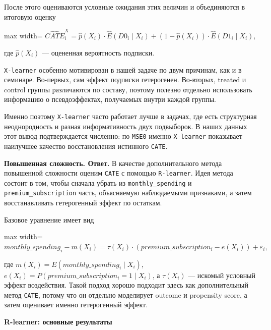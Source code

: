 \documentclass[11pt]{article}
\begin{document}
После этого оцениваются условные ожидания этих величин и объединяются в
итоговую оценку

\begin{center}
\begin{adjustbox}{max width=\linewidth}
\(\displaystyle \widehat{CATE}^{X}_i = \hat{p}(X_i) \cdot \widehat{E}(D0_i \mid X_i) + (1-\hat{p}(X_i)) \cdot \widehat{E}(D1_i \mid X_i),\)
\end{adjustbox}
\end{center}

где \(\hat{p}(X_i)\) --- оцененная вероятность подписки.

    \texttt{X-learner} особенно мотивирован в нашей задаче по двум причинам,
как и в семинаре. Во-первых, сам эффект подписки гетерогенен. Во-вторых,
treated и control группы различаются по составу, поэтому полезно
отдельно использовать информацию о псевдоэффектах, получаемых внутри
каждой группы.

Именно поэтому \texttt{X-learner} часто работает лучше в задачах, где
есть структурная неоднородность и разная информативность двух
подвыборок. В наших данных этот вывод подтверждается численно: по
\texttt{MSE0} именно \texttt{X-learner} показывает наилучшее качество
восстановления истинного \texttt{CATE}.

    \textbf{Повышенная сложность. Ответ.} В качестве дополнительного метода
повышенной сложности оценим \texttt{CATE} с помощью \texttt{R-learner}.
Идея метода состоит в том, чтобы сначала убрать из
\texttt{monthly\_spending} и \texttt{premium\_subscription} часть,
объясняемую наблюдаемыми признаками, а затем восстанавливать
гетерогенный эффект по остаткам.

Базовое уравнение имеет вид

\begin{center}
\begin{adjustbox}{max width=\linewidth}
\(\displaystyle monthly\_spending_i - m(X_i) = \tau(X_i) \cdot (premium\_subscription_i - e(X_i)) + \varepsilon_i,\)
\end{adjustbox}
\end{center}

где \(m(X_i) = E(monthly\_spending_i \mid X_i)\),
\(e(X_i) = P(premium\_subscription_i = 1 \mid X_i)\), а \(\tau(X_i)\)
--- искомый условный эффект воздействия. Такой подход хорошо подходит
здесь как дополнительный метод \texttt{CATE}, потому что он отдельно
моделирует outcome и propensity score, а затем оценивает именно
гетерогенный эффект.

    \textbf{R-learner: основные результаты}
\end{document}
